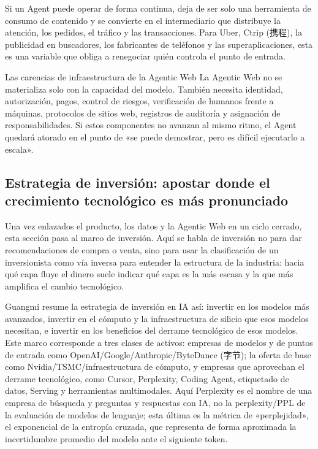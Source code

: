 \documentclass[a4paper]{article}
\begin{document}
Si un Agent puede operar de forma continua, deja de ser solo una herramienta de consumo de contenido y se convierte en el intermediario que distribuye la atención, los pedidos, el tráfico y las transacciones. Para Uber, Ctrip (携程), la publicidad en buscadores, los fabricantes de teléfonos y las superaplicaciones, esta es una variable que obliga a renegociar quién controla el punto de entrada.

\begin{warningbox}{Las carencias de infraestructura de la Agentic Web}
La Agentic Web no se materializa solo con la capacidad del modelo. También necesita identidad, autorización, pagos, control de riesgos, verificación de humanos frente a máquinas, protocolos de sitios web, registros de auditoría y asignación de responsabilidades. Si estos componentes no avanzan al mismo ritmo, el Agent quedará atorado en el punto de «se puede demostrar, pero es difícil ejecutarlo a escala».
\end{warningbox}

\subsection{Estrategia de inversión: apostar donde el crecimiento tecnológico es más pronunciado}

Una vez enlazados el producto, los datos y la Agentic Web en un ciclo cerrado, esta sección pasa al marco de inversión. Aquí se habla de inversión no para dar recomendaciones de compra o venta, sino para usar la clasificación de un inversionista como vía inversa para entender la estructura de la industria: hacia qué capa fluye el dinero suele indicar qué capa es la más escasa y la que más amplifica el cambio tecnológico.

Guangmi resume la estrategia de inversión en IA así: invertir en los modelos más avanzados, invertir en el cómputo y la infraestructura de silicio que esos modelos necesitan, e invertir en los beneficios del derrame tecnológico de esos modelos. Este marco corresponde a tres clases de activos: empresas de modelos y de puntos de entrada como OpenAI/Google/Anthropic/ByteDance (字节); la oferta de base como Nvidia/TSMC/infraestructura de cómputo, y empresas que aprovechan el derrame tecnológico, como Cursor, Perplexity, Coding Agent, etiquetado de datos, Serving y herramientas multimodales. Aquí Perplexity es el nombre de una empresa de búsqueda y preguntas y respuestas con IA, no la perplexity/PPL de la evaluación de modelos de lenguaje; esta última es la métrica de «perplejidad», el exponencial de la entropía cruzada, que representa de forma aproximada la incertidumbre promedio del modelo ante el siguiente token.
\end{document}
